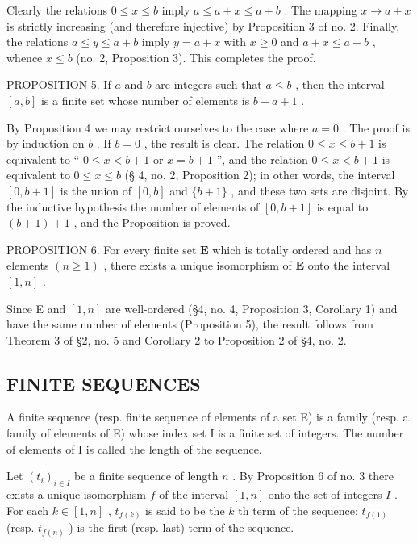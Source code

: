 Clearly the relations \(0 \leqslant x \leqslant b\) imply \(a \leqslant a + x \leqslant a + b\) . The mapping \(x \to a + x\) is strictly increasing (and therefore injective) by Proposition 3 of no. 2. Finally, the relations \(a \leqslant y \leqslant a + b\) imply \(y = a + x\) with \(x \geqslant 0\) and \(a + x \leqslant a + b\) , whence \(x \leqslant b\) (no. 2, Proposition 3). This completes the proof.

PROPOSITION 5. If \(a\) and \(b\) are integers such that \(a \leqslant b\) , then the interval \([a, b]\) is a finite set whose number of elements is \(b - a + 1\) .

By Proposition 4 we may restrict ourselves to the case where \(a=0\) . The proof is by induction on \(b\) . If \(b=0\) , the result is clear. The relation \(0 \leqslant x \leqslant b+1\) is equivalent to `` \(0 \leqslant x < b+1\) or \(x=b+1\) '', and the relation \(0 \leqslant x < b+1\) is equivalent to \(0 \leqslant x \leqslant b\) (§ 4, no. 2, Proposition 2); in other words, the interval \([0, b+1]\) is the union of \([0, b]\) and \(\{b+1\}\) , and these two sets are disjoint. By the inductive hypothesis the number of elements of \([0, b+1]\) is equal to \((b+1)+1\) , and the Proposition is proved.

PROPOSITION 6. For every finite set \(\mathbf{E}\) which is totally ordered and has \(n\) elements \((n \geqslant 1)\) , there exists a unique isomorphism of \(\mathbf{E}\) onto the interval \([1, n]\) .

Since E and \([1, n]\) are well-ordered (§4, no. 4, Proposition 3, Corollary 1) and have the same number of elements (Proposition 5), the result follows from Theorem 3 of §2, no. 5 and Corollary 2 to Proposition 2 of §4, no. 2.

\subsection{FINITE SEQUENCES}

A finite sequence (resp. finite sequence of elements of a set E) is a family (resp. a family of elements of E) whose index set I is a finite set of integers. The number of elements of I is called the length of the sequence.

Let \((t_i)_{i \in I}\) be a finite sequence of length \(n\) . By Proposition 6 of no. 3 there exists a unique isomorphism \(f\) of the interval \([1, n]\) onto the set of integers \(I\) . For each \(k \in [1, n]\) , \(t_{f(k)}\) is said to be the \(k\) th term of the sequence; \(t_{f(1)}\) (resp. \(t_{f(n)}\) ) is the first (resp. last) term of the sequence.

